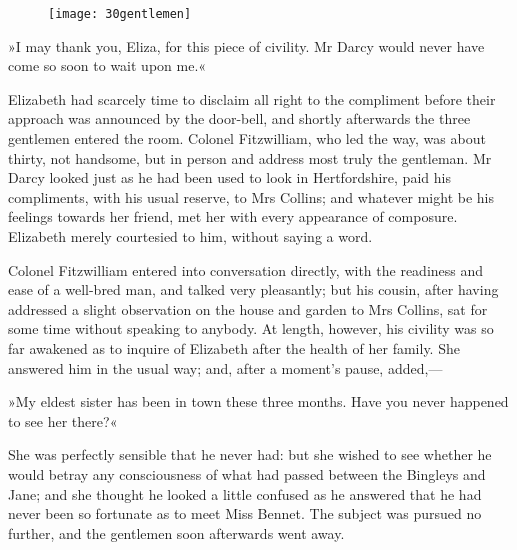 \begin{figure}[tbh]
\centering
\texttt{[image: 30gentlemen]}
\end{figure}

»I may thank you, Eliza, for this piece of civility. Mr Darcy would never have come so soon to wait upon me.«

Elizabeth had scarcely time to disclaim all right to the compliment before their approach was announced by the door-bell, and shortly afterwards the three gentlemen entered the room. Colonel Fitzwilliam, who led the way, was about thirty, not handsome, but in person and address most truly the gentleman. Mr Darcy looked just as he had been used to look in Hertfordshire, paid his compliments, with his usual reserve, to Mrs Collins; and whatever might be his feelings towards her friend, met her with every appearance of composure. Elizabeth merely courtesied to him, without saying a word.

Colonel Fitzwilliam entered into conversation directly, with the readiness and ease of a well-bred man, and talked very pleasantly; but his cousin, after having addressed a slight observation on the house and garden to Mrs Collins, sat for some time without speaking to anybody. At length, however, his civility was so far awakened as to inquire of Elizabeth after the health of her family. She answered him in the usual way; and, after a moment's pause, added,—

»My eldest sister has been in town these three months. Have you never happened to see her there?«

She was perfectly sensible that he never had: but she wished to see whether he would betray any consciousness of what had passed between the Bingleys and Jane; and she thought he looked a little confused as he answered that he had never been so fortunate as to meet Miss Bennet. The subject was pursued no further, and the gentlemen soon afterwards went away.